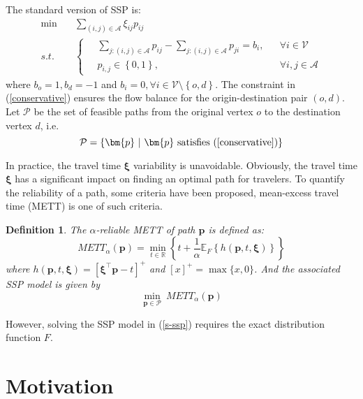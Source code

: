 \documentclass{article}
\newtheorem{defin}{Definition}
\begin{document}
\noindent The standard version of SSP is:
\begin{align}
	\min \quad & \sum_{(i, j) \in \mathcal{A}} \xi_{ij} p_{ij} \\
	s.t. \quad & \left\{ 
	\begin{aligned} \label{conservative}
		\ & \sum_{j:(i, j) \in \mathcal{A}} p_{ij} - \sum_{j:(i, j) \in \mathcal{A}} p_{ji} = b_i, && \forall i \in \mathcal{V} \\
		& p_{i, j} \in \left\{0, 1\right\}, && \forall i, j \in \mathcal{A}
	\end{aligned} \right. 
\end{align}
where $b_o = 1, b_d = -1$ and $b_i = 0, \forall i \in \mathcal{V} \setminus \left\{o, d\right\}$. The constraint in (\ref{conservative}) ensures the flow balance for the origin-destination pair $(o, d)$. Let $\mathcal{P}$ be the set of feasible paths from the original vertex $o$ to the destination vertex $d$, i.e. 
\begin{equation}
	\mathcal{P} = \left\{\bm{p} \ | \ \bm{p} \ \text{satisfies} \ (\ref{conservative})\right\}
\end{equation}

In practice, the travel time $\bm{\xi}$ variability is unavoidable. Obviously, the travel time $\bm{\xi}$ has a significant impact on finding an optimal path for travelers.  To quantify the reliability of a path, some criteria have been proposed, mean-excess travel time (METT) is one of such criteria.

\begin{defin}
	The $\alpha$-reliable METT of path $\bm{p}$ is defined as:
	\begin{equation}
		METT_{\alpha} (\bm{p}) = \min_{t \in \mathbb{R}} \left\{t + \frac{1}{\alpha} \mathbb{E}_{F}\left\{h(\bm{p}, t, \bm{\xi})\right\} \right\}
	\end{equation} 
	where $h(\bm{p}, t, \bm{\xi}) = [\bm{\xi}^\top\bm{p} - t]^+$ and $[x]^+ = \max\{x, 0\}$. And the associated SSP model is given by
	\begin{equation} \label{s-ssp}
		\min_{\bm{p} \in \mathcal{P}} \ METT_{\alpha} (\bm{p})
	\end{equation} 
\end{defin}

However, solving the SSP model in (\ref{s-ssp}) requires the exact distribution function $F$. 

\section{Motivation}
\end{document}
